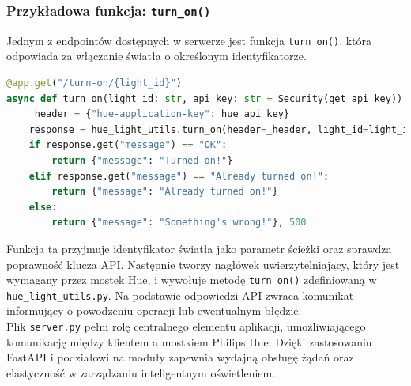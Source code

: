\documentclass[12pt]{article}
\begin{document}
\subsubsection*{Przykładowa funkcja: \texttt{turn\_on()}}
\noindent Jednym z endpointów dostępnych w serwerze jest funkcja \texttt{turn\_on()}, która odpowiada za włączanie światła o określonym identyfikatorze. 

\begin{lstlisting}[language=Python]
@app.get("/turn-on/{light_id}")
async def turn_on(light_id: str, api_key: str = Security(get_api_key)):
    _header = {"hue-application-key": hue_api_key}
    response = hue_light_utils.turn_on(header=_header, light_id=light_id, bridge_ip=hue_bridge_ip_address)
    if response.get("message") == "OK":
        return {"message": "Turned on!"}
    elif response.get("message") == "Already turned on!":
        return {"message": "Already turned on!"}
    else:
        return {"message": "Something's wrong!"}, 500
\end{lstlisting}
Funkcja ta przyjmuje identyfikator światła jako parametr ścieżki oraz sprawdza poprawność klucza API. Następnie tworzy nagłówek uwierzytelniający, który jest wymagany przez mostek Hue,
i wywołuje metodę \texttt{turn\_on()} zdefiniowaną w \texttt{hue\_light\_utils.py}. Na podstawie odpowiedzi API zwraca komunikat informujący o powodzeniu operacji lub ewentualnym błędzie.\\
Plik \texttt{server.py} pełni rolę centralnego elementu aplikacji, umożliwiającego komunikację między klientem a mostkiem Philips Hue. Dzięki zastosowaniu FastAPI i podziałowi na moduły
zapewnia wydajną obsługę żądań oraz elastyczność w zarządzaniu inteligentnym oświetleniem.

\clearpage
\end{document}
